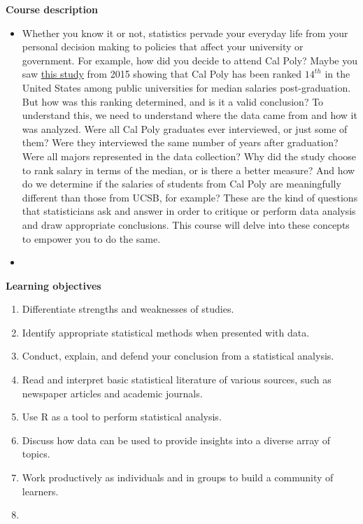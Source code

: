 \documentclass[letterpaper,12pt]{report}
\begin{document}
\textbf{Course description}
\begin{itemize}
\item[]
Whether you know it or not, statistics pervade your everyday life from your personal decision making to policies that affect your university or government. For example, how did you decide to attend Cal Poly? Maybe you saw \href{http://www.sanluisobispo.com/news/local/education/article39060447.html}{this study} from 2015 showing that Cal Poly has been ranked $14^{th}$ in the United States among public universities for median salaries post-graduation. But how was this ranking determined, and is it a valid conclusion? To understand this, we need to understand where the data came from and how it was analyzed. Were all Cal Poly graduates ever interviewed, or just some of them? Were they interviewed the same number of years after graduation? Were all majors represented in the data collection? Why did the study choose to rank salary in terms of the median, or is there a better measure? And how do we determine if the salaries of students from Cal Poly are meaningfully different than those from UCSB, for example? These are the kind of questions that statisticians ask and answer in order to critique or perform data analysis and draw appropriate conclusions. This course will delve into these concepts to empower you to do the same.
\item[]
\end{itemize}


\textbf{Learning objectives}
\begin{enumerate}
\item Differentiate strengths and weaknesses of studies.
\item Identify appropriate statistical methods when presented with data.
\item Conduct, explain, and defend your conclusion from a statistical analysis.
\item Read and interpret basic statistical literature of various sources, such as newspaper articles and academic journals.
\item Use R as a tool to perform statistical analysis.
\item Discuss how data can be used to provide insights into a diverse array of topics.
\item Work productively as individuals and in groups to build a community of learners.
\item[]
\end{enumerate}
\end{document}
